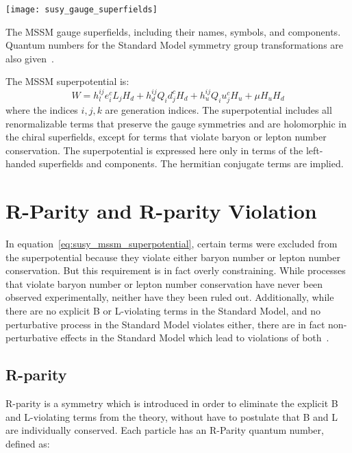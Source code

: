 \begin{table}[!ht]
    \centering

  \texttt{[image: susy\_gauge\_superfields]}
    \caption{The MSSM gauge superfields, including their names, symbols, and components.
  Quantum numbers for the Standard Model symmetry group transformations are also given~\cite{susy-primer-1998}.}\label{tbl:susy_gauge_fields}
\end{table}
The MSSM superpotential is:
\begin{equation}\label{eq:susy_mssm_superpotential}
    W = h_l^{ij} e_i^c L_j H_d + h_d^{ij} Q_i d_j^c H_d + h_u^{ij} Q_i u_j^c H_u + \mu H_u H_d
\end{equation}
where the indices $i, j, k$ are generation indices.
The superpotential includes all renormalizable terms that preserve the gauge symmetries and are holomorphic in the chiral superfields, except for terms that violate baryon or lepton number conservation.
The superpotential is expressed here only in terms of the left-handed superfields and components.
The hermitian conjugate terms are implied.

\section{R-Parity and R-parity Violation}\label{sec:susy_rpv}

In equation~\ref{eq:susy_mssm_superpotential}, certain terms were excluded from the superpotential because they
violate either baryon number or lepton number conservation.
But this requirement is in fact overly constraining.
While processes that violate baryon number or lepton number conservation have never been observed experimentally,
neither have they been ruled out.
Additionally, while there are no explicit B or L-violating terms in the Standard Model,
and no perturbative process in the Standard Model violates either,
there are in fact non-perturbative effects in the Standard Model which lead to violations of both~\cite{susy-bl-violation}.

\subsection{R-parity}\label{subsec:r_parity}

R-parity is a symmetry which is introduced in order to eliminate the explicit B and L-violating terms from the theory, without have to postulate that B and L are individually conserved.
Each particle has an R-Parity quantum number, defined as:

